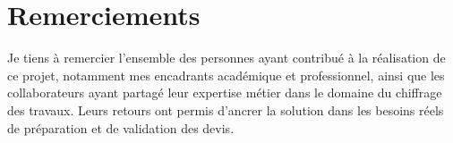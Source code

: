 \section*{Remerciements}
Je tiens à remercier l'ensemble des personnes ayant contribué à la réalisation de ce projet, notamment mes encadrants académique et professionnel, ainsi que les collaborateurs ayant partagé leur expertise métier dans le domaine du chiffrage des travaux. Leurs retours ont permis d'ancrer la solution dans les besoins réels de préparation et de validation des devis.
\newpage
